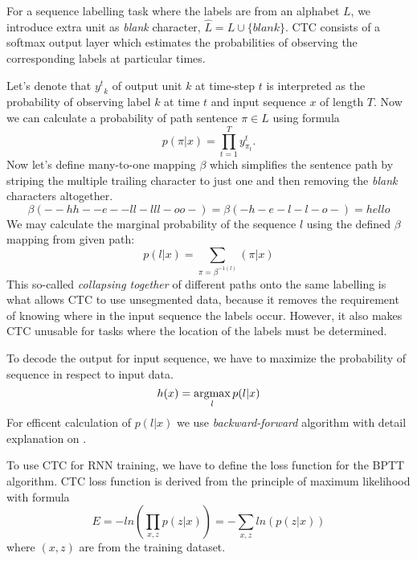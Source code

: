 For a sequence labelling task where the labels are from an alphabet $L$, we introduce extra unit as \textit{blank} character, $\hat{L}=L\cup\{blank\}$.
CTC consists of a softmax output layer which estimates the probabilities of observing the corresponding labels at particular times\cite{ctc_info}.

Let's denote that ${y^t}_{k}$ of output unit $k$ at time-step $t$ is interpreted as the probability of observing label $k$ at time $t$ and input sequence $x$ of length $T$.
Now we can calculate a probability of path sentence $\pi\in\hat{L}$ using formula
\begin{equation} \label{eq:7}
  p(\pi|x) = \prod_{t=1}^{T}y^{t}_{\pi_t}.
\end{equation}
Now let's define many-to-one mapping $\beta$ which simplifies the sentence path by striping the multiple trailing character to just one and then removing the \textit{blank} characters altogether.
\[ \beta(--hh--e--ll-lll-oo-) = \beta(-h-e-l-l-o-) = hello \]
We may calculate the marginal probability of the sequence $l$ using the defined $\beta$ mapping from given path:
\begin{equation} \label{eq:8}
  p(l|x) = \sum_{\pi=\beta^{-1(l)}}(\pi|x)
\end{equation}
This so-called \textit{collapsing together} of different paths onto the same labelling is what allows CTC to use unsegmented data, because it removes the requirement of knowing where in the input sequence the labels occur.
However, it also makes CTC unusable for tasks where the location of the labels must be determined\cite{ctc_info}.

To decode the output for input sequence, we have to maximize the probability of sequence in respect to input data.
\begin{equation} \label{eq:9}
  h(x) = \operatorname*{argmax}_l p(l|x)
\end{equation}
For efficent calculation of $p(l|x)$ we use \textit{backward-forward} algorithm with detail explanation on \cite{ctc}.

To use CTC for RNN training, we have to define the loss function for the BPTT algorithm.
CTC loss function is derived from the principle of maximum likelihood with formula
\begin{equation} \label{eq:10}
  E = -ln(\prod_{x,z}p(z|x)) = - \sum_{x,z} ln(p(z|x))
\end{equation}
where $(x,z)$ are from the training dataset\cite{ctc_info}.

